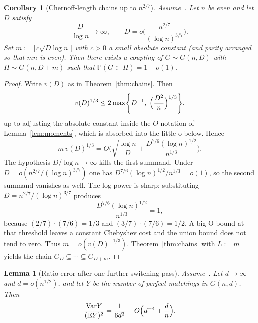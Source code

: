 \documentclass[11pt]{article}
\newtheorem{lemma}[theorem]{Lemma}
\newtheorem{corollary}[theorem]{Corollary}
\newcommand{\Gnd}{G(n,d)}
\newcommand{\EE}{\mathbb{E}}
\newcommand{\PP}{\mathbb{P}}
\newcommand{\Var}{\mathrm{Var}}
\begin{document}
\begin{corollary}[Chernoff-length chains up to \(n^{2/7}\)]
\label{cor:chernoff-chains}
Assume~\cite[Theorem~6]{Gao20}.
Let \(n\) be even and let \(D\) satisfy
\[
\frac{D}{\log n}\to\infty,
\qquad
D=o\Biggl(\frac{n^{2/7}}{(\log n)^{3/7}}\Biggr).
\]
Set \(m:=\lfloor c\sqrt{D\log n}\rfloor\) with \(c>0\) a small absolute constant
(and parity arranged so that \(mn\) is even).
Then there exists a coupling of \(G\sim G(n,D)\) with \(H\sim G(n,D+m)\) such that
\(\PP(G\subset H)=1-o(1)\).
\end{corollary}

\begin{proof}
Write \(v(D)\) as in Theorem~\ref{thm:chains}. Then
\[
v(D)^{1/3}
\le
2\max\Biggl\{
D^{-1},\;
\Bigl(\frac{D^2}{n}\Bigr)^{1/3}
\Biggr\},
\]
up to adjusting the absolute constant inside the \(O\)-notation of
Lemma~\ref{lem:moments}, which is absorbed into the little-o below.
Hence
\[
m\,v(D)^{1/3}
=
O\Biggl(
\sqrt{\frac{\log n}{D}}
+
\frac{D^{7/6}(\log n)^{1/2}}{n^{1/3}}
\Biggr).
\]
The hypothesis \(D/\log n\to\infty\) kills the first summand.
Under \(D=o(n^{2/7}/(\log n)^{3/7})\) one has
\(D^{7/6}(\log n)^{1/2}/n^{1/3}=o(1)\), so the second summand vanishes as well.
The log power is sharp: substituting \(D=n^{2/7}/(\log n)^{3/7}\) produces
\[
\frac{D^{7/6}(\log n)^{1/2}}{n^{1/3}}
=
1,
\]
because \((2/7)\cdot(7/6)=1/3\) and \((3/7)\cdot(7/6)=1/2\).
A big-O bound at that threshold leaves a constant Chebyshev cost and the union bound does not tend to zero.
Thus \(m=o(v(D)^{-1/3})\). Theorem~\ref{thm:chains} with \(L:=m\) yields the chain
\(G_D\subseteq\cdots\subseteq G_{D+m}\).
\end{proof}

\begin{lemma}[Ratio error after one further switching pass]
\label{lem:ratio-error}
Assume~\cite[Theorem~6]{Gao20}. Let \(d\to\infty\) and \(d=o(n^{1/2})\), and let
\(Y\) be the number of perfect matchings in \(\Gnd\). Then
\[
\frac{\Var Y}{(\EE Y)^2}
=
\frac1{6d^3}+O\Bigl(d^{-4}+\frac{d}{n}\Bigr).
\]
\end{lemma}
\end{document}
